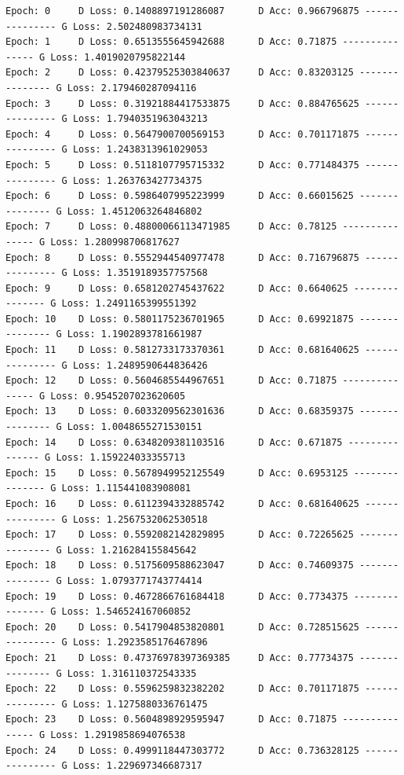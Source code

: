 \documentclass[11pt]{article}
\begin{document}
    \begin{Verbatim}[commandchars=\\\{\}]
Epoch: 0 	 D Loss: 0.1408897191286087 	 D Acc: 0.966796875 --------------- G Loss: 2.502480983734131
Epoch: 1 	 D Loss: 0.6513555645942688 	 D Acc: 0.71875 --------------- G Loss: 1.4019020795822144
Epoch: 2 	 D Loss: 0.42379525303840637 	 D Acc: 0.83203125 --------------- G Loss: 2.179460287094116
Epoch: 3 	 D Loss: 0.31921884417533875 	 D Acc: 0.884765625 --------------- G Loss: 1.7940351963043213
Epoch: 4 	 D Loss: 0.5647900700569153 	 D Acc: 0.701171875 --------------- G Loss: 1.2438313961029053
Epoch: 5 	 D Loss: 0.5118107795715332 	 D Acc: 0.771484375 --------------- G Loss: 1.263763427734375
Epoch: 6 	 D Loss: 0.5986407995223999 	 D Acc: 0.66015625 --------------- G Loss: 1.4512063264846802
Epoch: 7 	 D Loss: 0.48800066113471985 	 D Acc: 0.78125 --------------- G Loss: 1.280998706817627
Epoch: 8 	 D Loss: 0.5552944540977478 	 D Acc: 0.716796875 --------------- G Loss: 1.3519189357757568
Epoch: 9 	 D Loss: 0.6581202745437622 	 D Acc: 0.6640625 --------------- G Loss: 1.2491165399551392
Epoch: 10 	 D Loss: 0.5801175236701965 	 D Acc: 0.69921875 --------------- G Loss: 1.1902893781661987
Epoch: 11 	 D Loss: 0.5812733173370361 	 D Acc: 0.681640625 --------------- G Loss: 1.2489590644836426
Epoch: 12 	 D Loss: 0.5604685544967651 	 D Acc: 0.71875 --------------- G Loss: 0.9545207023620605
Epoch: 13 	 D Loss: 0.6033209562301636 	 D Acc: 0.68359375 --------------- G Loss: 1.0048655271530151
Epoch: 14 	 D Loss: 0.6348209381103516 	 D Acc: 0.671875 --------------- G Loss: 1.159224033355713
Epoch: 15 	 D Loss: 0.5678949952125549 	 D Acc: 0.6953125 --------------- G Loss: 1.115441083908081
Epoch: 16 	 D Loss: 0.6112394332885742 	 D Acc: 0.681640625 --------------- G Loss: 1.2567532062530518
Epoch: 17 	 D Loss: 0.5592082142829895 	 D Acc: 0.72265625 --------------- G Loss: 1.216284155845642
Epoch: 18 	 D Loss: 0.5175609588623047 	 D Acc: 0.74609375 --------------- G Loss: 1.0793771743774414
Epoch: 19 	 D Loss: 0.4672866761684418 	 D Acc: 0.7734375 --------------- G Loss: 1.546524167060852
Epoch: 20 	 D Loss: 0.5417904853820801 	 D Acc: 0.728515625 --------------- G Loss: 1.2923585176467896
Epoch: 21 	 D Loss: 0.47376978397369385 	 D Acc: 0.77734375 --------------- G Loss: 1.316110372543335
Epoch: 22 	 D Loss: 0.5596259832382202 	 D Acc: 0.701171875 --------------- G Loss: 1.1275880336761475
Epoch: 23 	 D Loss: 0.5604898929595947 	 D Acc: 0.71875 --------------- G Loss: 1.2919858694076538
Epoch: 24 	 D Loss: 0.4999118447303772 	 D Acc: 0.736328125 --------------- G Loss: 1.229697346687317

\end{Verbatim}
\end{document}
